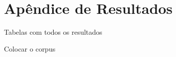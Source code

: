 \chapter{Apêndice de Resultados}
\label{ch09-appendice}

Tabelas com todos os resultados


Colocar o corpus
